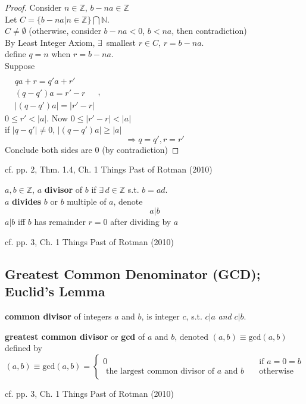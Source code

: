 \begin{proof}
	Consider $n \in \mathbb{Z}$, $b-na \in \mathbb{Z}$ \\
	Let $C= \lbrace b - na | n \in \mathbb{Z} \rbrace \bigcap \mathbb{N}$.  \\
	\phantom{\quad} $C\neq \emptyset$ (otherwise, consider $b-na < 0$, $b<na$, then contradiction) \\
	By Least Integer Axiom, $\exists \, $ smallest $r\in C$, $r= b-na$.  \\
	\phantom{\quad } define $q=n$ when $r=b-na$.  \\
	Suppose \\
	$\begin{aligned}  & \quad \\ & qa + r = q'a + r' \\ & (q-q')a = r'-r \\ & |(q-q')a| = |r'-r| \end{aligned}$, \\

	$0\leq r' < |a|$.  Now $0\leq |r'-r | < |a|$ \\
	\phantom{\quad } if $|q-q'| \neq 0$, $|(q-q')a | \geq |a|$ 
	\[
	\Longrightarrow q=q', r=r'
	\]
	Conclude both sides are $0$ (by contradiction)
\end{proof}
cf. pp. 2, Thm. 1.4, Ch. 1 Things Past of Rotman (2010) \cite{agat:JRotman2010}  

\begin{definition}[divisor]
	$a,b \in \mathbb{Z}$, $a$ \textbf{divisor} of $b$ if $\exists \, d \in \mathbb{Z}$ s.t. $b=ad$. \\
	$a$ \textbf{divides} $b$ or $b$ multiple of $a$, denote 
	\[
	a | b
	\]
	$a|b$ iff $b$ has remainder $r=0$ after dividing by $a$
\end{definition}
cf. pp. 3, Ch. 1 Things Past of Rotman (2010) \cite{agat:JRotman2010}  


\subsection{Greatest Common Denominator (GCD); Euclid's Lemma}

\begin{definition}
	\textbf{common divisor} of integers $a$ and $b$, is integer $c$, s.t. $ c | a$ \emph{and} $c|b$.  

\textbf{greatest common divisor} or \textbf{gcd} of $a$ and $b$, denoted $(a,b) \equiv \text{gcd}(a,b)$ defined by 
\[
(a,b) \equiv \text{gcd}(a,b) = \begin{cases} 0 & \text{ if } a = 0 = b \\ 
 \text{ the largest common divisor of $a$ and $b$ } & \text{ otherwise } \end{cases}  
\]
	\end{definition} 
cf. pp. 3, Ch. 1 Things Past of Rotman (2010) \cite{agat:JRotman2010}  

